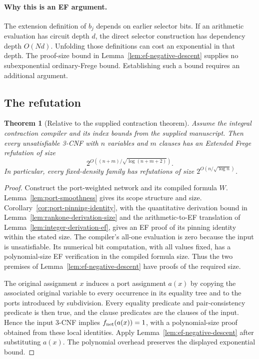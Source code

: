 \documentclass[11pt]{article}
\newtheorem{theorem}{Theorem}[section]
\theoremstyle{definition}
\theoremstyle{remark}
\begin{document}
\paragraph{Why this is an EF argument.}
The extension definition of $b_j$ depends on earlier selector bits.
If an arithmetic evaluation has circuit depth $d$, the direct selector
construction has dependency depth $O(Nd)$. Unfolding those definitions
can cost an exponential in that depth. The proof-size bound in
Lemma~\ref{lem:ef-negative-descent} supplies no subexponential
ordinary-Frege bound. Establishing such a bound requires an additional
argument.

\subsection{The refutation}

\begin{theorem}[Relative to the supplied contraction theorem]
\label{thm:direct-subexp-ef}
Assume the integral contraction compiler and its index bounds from
the supplied manuscript. Then every
unsatisfiable 3-CNF with $n$ variables and $m$ clauses has an Extended
Frege refutation of size
\[
 2^{O((n+m)/\sqrt{\log(n+m+2)})}.
\]
In particular, every fixed-density family has refutations of size
$2^{O(n/\sqrt{\log n})}$.
\end{theorem}
\begin{proof}
Construct the port-weighted network and its compiled formula $W$.
Lemma~\ref{lem:port-smoothness} gives its scope structure and size.
Corollary~\ref{cor:port-pinning-identity}, with the quantitative
derivation bound in Lemma~\ref{lem:rankone-derivation-size} and the
arithmetic-to-EF translation of Lemma~\ref{lem:integer-derivation-ef},
gives an EF proof of its pinning identity within the stated size. The compiler's all-one evaluation is zero because
the input is unsatisfiable. Its numerical bit computation, with all
values fixed, has a polynomial-size EF verification in the compiled
formula size. Thus the two premises of
Lemma~\ref{lem:ef-negative-descent} have proofs of the required size.

The original assignment $x$ induces a port assignment $a(x)$ by
copying the associated original variable to every occurrence in its
equality tree and to the ports introduced by subdivision. Every
equality predicate and pair-consistency predicate is then true, and
the clause predicates are the clauses of the input. Hence the input
3-CNF implies $f_{\rm net}(a(x))=1$, with a polynomial-size proof
obtained from these local identities. Apply
Lemma~\ref{lem:ef-negative-descent} after substituting $a(x)$.
The polynomial overhead preserves the displayed exponential bound.
\end{proof}
\end{document}
